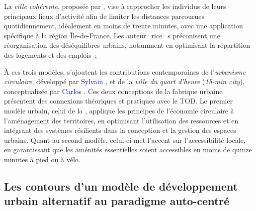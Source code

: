 \begin{refsegment}
\begin{customitemize}
\item La \textsl{ville cohérente}, proposée par \textcolor{blue}{\textcite{korsu_ville_2012}}, vise à rapprocher les individus de leurs principaux lieux d’activité afin de limiter les distances parcourues quotidiennement, idéalement en moins de trente minutes, avec une application spécifique à la région Île-de-France. Les auteur·rice·s préconisent une réorganisation des déséquilibres urbains, notamment en optimisant la répartition des logements et des emplois~;
\item À ces trois modèles, s’ajoutent les contributions contemporaines de l’\textsl{urbanisme circulaire}, développé par \textcolor{blue}{Sylvain} \textcolor{blue}{\textcite{grisot_manifeste_2020}}, et de la \textsl{ville du quart d’heure} (\textsl{15-min city}), conceptualisée par \textcolor{blue}{Carlos} \textcolor{blue}{\textcite{moreno_droit_2020}}. Ces deux conceptions de la fabrique urbaine présentent des connexions théoriques et pratiques avec le \acrshort{TOD}. Le premier modèle urbain, celui de la   \textcolor{blue}{\autocite[76-80]{chalendar_defi_2021}}, applique les principes de l’économie circulaire à l’aménagement des territoires, en optimisant l’utilisation des ressources et en intégrant des systèmes résilients dans la conception et la gestion des espaces urbains. Quant au second modèle, celui-ci met l’accent sur l’accessibilité locale, en garantissant que les aménités essentielles soient accessibles en moins de quinze minutes à pied ou à vélo.
    \end{customitemize}%

\subsection{Les contours d'un modèle de développement urbain alternatif au paradigme auto-centré
    \label{chap1:tod-presentation-generale-definition}
    }


\end{refsegment}
